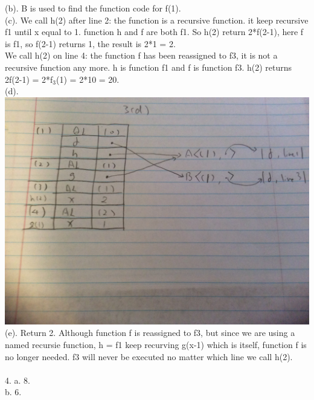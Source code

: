 \documentclass[12pt]{article}
\begin{document}
(b). B is used to find the function code for f(1).\\
(c).  We call h(2) after line 2: the function is a recursive function. it keep recursive f1 until x equal to 1. function h and f are both f1. So h(2) return 2*f(2-1), here f is f1, so f(2-1) returns 1, the result is 2*1 = 2.\\
We call h(2) on line 4: the function f has been reassigned to f3, it is not a recursive function any more. h is function f1 and f is function f3. h(2) returns 2f(2-1) = 2*f$_3$(1) = 2*10 = 20.\\
(d). \\
\includegraphics[width=\textwidth]{3d.jpg}
(e). Return 2. Although function f is reassigned to f3, but since we are using a named recursie function, h = f1 keep recurving g(x-1) which is itself, function f is no longer needed. f3 will never be executed no matter which line we call h(2).\\
\vspace{1mm}\\
4. a. 8.\\ 
b. 6.\\
\end{document}
